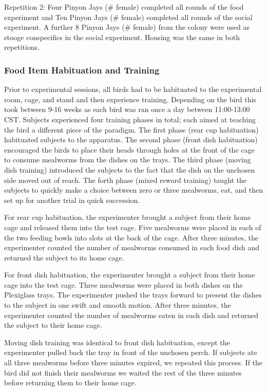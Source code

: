 \documentclass[
]{article}
\begin{document}
Repetition 2: Four Pinyon Jays (\# female) completed all rounds of the
food experiment and Ten Pinyon Jays (\# female) completed all rounds of
the social experiment. A further 8 Pinyon Jays (\# female) from the
colony were used as stooge conspecifics in the social experiment.
Housing was the same in both repetitions.

\hypertarget{food-item-habituation-and-training}{%
\subsubsection{Food Item Habituation and
Training}\label{food-item-habituation-and-training}}

Prior to experimental sessions, all birds had to be habituated to the
experimental room, cage, and stand and then experience training.
Depending on the bird this took between 9-16 weeks as each bird was ran
once a day between 11:00-13:00 CST. Subjects experienced four training
phases in total; each aimed at teaching the bird a different piece of
the paradigm. The first phase (rear cup habituation) habituated subjects
to the apparatus. The second phase (front dish habituation) encouraged
the birds to place their heads through holes at the front of the cage to
consume mealworms from the dishes on the trays. The third phase (moving
dish training) introduced the subjects to the fact that the dish on the
unchosen side moved out of reach. The forth phase (mixed reward
training) taught the subjects to quickly make a choice between zero or
three mealworms, eat, and then set up for another trial in quick
succession.

For rear cup habituation, the experimenter brought a subject from their
home cage and released them into the test cage. Five mealworms were
placed in each of the two feeding bowls into slots at the back of the
cage. After three minutes, the experimenter counted the number of
mealworms consumed in each food dish and returned the subject to its
home cage.

For front dish habituation, the experimenter brought a subject from
their home cage into the test cage. Three mealworms were placed in both
dishes on the Plexiglass trays. The experimenter pushed the trays
forward to present the dishes to the subject in one swift and smooth
motion. After three minutes, the experimenter counted the number of
mealworms eaten in each dish and returned the subject to their home
cage.

Moving dish training was identical to front dish habituation, except the
experimenter pulled back the tray in front of the unchosen perch. If
subjects ate all three mealworms before three minutes expired, we
repeated this process. If the bird did not finish their mealworms we
waited the rest of the three minutes before returning them to their home
cage.
\end{document}
